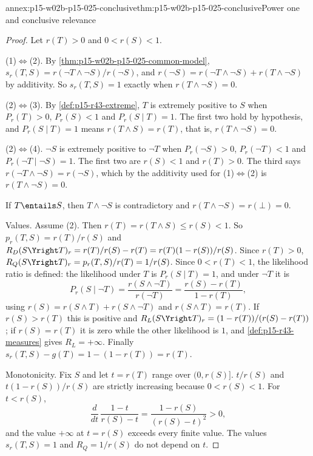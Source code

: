 \begin{annexitem}{annex:p15-w02b-p15-025-conclusive}{thm:p15-w02b-p15-025-conclusive}{Power one and conclusive relevance}
\begin{proof}
Let \(r(T)>0\) and \(0<r(S)<1\).

(1)\(\Leftrightarrow\)(2). By \cref{thm:p15-w02b-p15-025-common-model},
\(s_r(T,S)=r(\neg T\wedge\neg S)/r(\neg S)\), and
\(r(\neg S)=r(\neg T\wedge\neg S)+r(T\wedge\neg S)\) by additivity. So
\(s_r(T,S)=1\) exactly when \(r(T\wedge\neg S)=0\).

(2)\(\Leftrightarrow\)(3). By \cref{def:p15-r43-extreme}, \(T\) is
extremely positive to \(S\) when \(P_r(T)>0\), \(P_r(S)<1\) and
\(P_r(S\mid T)=1\). The first two hold by hypothesis, and
\(P_r(S\mid T)=1\) means \(r(T\wedge S)=r(T)\), that is,
\(r(T\wedge\neg S)=0\).

(2)\(\Leftrightarrow\)(4). \(\neg S\) is extremely positive to \(\neg T\)
when \(P_r(\neg S)>0\), \(P_r(\neg T)<1\) and
\(P_r(\neg T\mid\neg S)=1\). The first two are \(r(S)<1\) and
\(r(T)>0\). The third says \(r(\neg T\wedge\neg S)=r(\neg S)\), which by
the additivity used for (1)\(\Leftrightarrow\)(2) is
\(r(T\wedge\neg S)=0\).

If \(T\entails S\), then \(T\wedge\neg S\) is contradictory and
\(r(T\wedge\neg S)=r(\bot)=0\).

Values. Assume (2). Then \(r(T)=r(T\wedge S)\le r(S)<1\). So
\(p_r(T,S)=r(T)/r(S)\) and
\(R_D(S\Yright T)_r=r(T)/r(S)-r(T)=r(T)(1-r(S))/r(S)\). Since
\(r(T)>0\), \(R_Q(S\Yright T)_r=p_r(T,S)/r(T)=1/r(S)\). Since
\(0<r(T)<1\), the likelihood ratio is defined: the likelihood under
\(T\) is \(P_r(S\mid T)=1\), and under \(\neg T\) it is
\[
 P_r(S\mid\neg T)=\frac{r(S\wedge\neg T)}{r(\neg T)}
 =\frac{r(S)-r(T)}{1-r(T)} ,
\]
using \(r(S)=r(S\wedge T)+r(S\wedge\neg T)\) and \(r(S\wedge T)=r(T)\).
If \(r(S)>r(T)\) this is positive and
\(R_L(S\Yright T)_r=(1-r(T))/(r(S)-r(T))\); if \(r(S)=r(T)\) it is zero
while the other likelihood is \(1\), and \cref{def:p15-r43-measures}
gives \(R_L=+\infty\). Finally \(s_r(T,S)-g(T)=1-(1-r(T))=r(T)\).

Monotonicity. Fix \(S\) and let \(t=r(T)\) range over \((0,r(S)]\).
\(t/r(S)\) and \(t(1-r(S))/r(S)\) are strictly increasing because
\(0<r(S)<1\). For \(t<r(S)\),
\[
 \frac{d}{dt}\,\frac{1-t}{r(S)-t}=\frac{1-r(S)}{(r(S)-t)^2}>0,
\]
and the value \(+\infty\) at \(t=r(S)\) exceeds every finite value. The
values \(s_r(T,S)=1\) and \(R_Q=1/r(S)\) do not depend on \(t\).
\end{proof}
\end{annexitem}

